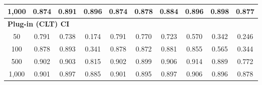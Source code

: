 \documentclass{article}
\numberwithin{equation}{section}
\begin{document}
\begin{table}[ht]
\begin{tabular}{c|ccc|cccccc}
1{,}000
& \cellcolor{covheat!87!white}0.874 & \cellcolor{covheat!96!white}0.891 & \cellcolor{covheat!98!white}0.896
& \cellcolor{covheat!87!white}0.874 & \cellcolor{covheat!89!white}0.878 & \cellcolor{covheat!92!white}0.884 & \cellcolor{covheat!98!white}0.896 & \cellcolor{covheat!99!white}0.898 & \cellcolor{covheat!88!white}0.877 \\
\hline
\multicolumn{10}{l}{\textbf{Plug-in (CLT) CI}} \\ \hline
50
& \cellcolor{covheat!46!white}0.791 & \cellcolor{covheat!19!white}0.738 & 0.174
& \cellcolor{covheat!46!white}0.791 & \cellcolor{covheat!35!white}0.770 & \cellcolor{covheat!12!white}0.723 & 0.570 & 0.342 & 0.246 \\
100
& \cellcolor{covheat!89!white}0.878 & \cellcolor{covheat!96!white}0.893 & 0.341
& \cellcolor{covheat!89!white}0.878 & \cellcolor{covheat!86!white}0.872 & \cellcolor{covheat!90!white}0.881 & \cellcolor{covheat!77!white}0.855 & 0.565 & 0.344 \\
500
& \cellcolor{covheat!100!white}0.902 & \cellcolor{covheat!100!white}0.903 & \cellcolor{covheat!57!white}0.815
& \cellcolor{covheat!100!white}0.902 & \cellcolor{covheat!100!white}0.899 & \cellcolor{covheat!100!white}0.906 & \cellcolor{covheat!100!white}0.914 & \cellcolor{covheat!94!white}0.889 & \cellcolor{covheat!36!white}0.772 \\
1{,}000
& \cellcolor{covheat!100!white}0.901 & \cellcolor{covheat!98!white}0.897 & \cellcolor{covheat!92!white}0.885
& \cellcolor{covheat!100!white}0.901 & \cellcolor{covheat!98!white}0.895 & \cellcolor{covheat!98!white}0.897 & \cellcolor{covheat!100!white}0.906 & \cellcolor{covheat!98!white}0.896 & \cellcolor{covheat!89!white}0.878 \\
\hline
\end{tabular}
\end{table}
\end{document}

